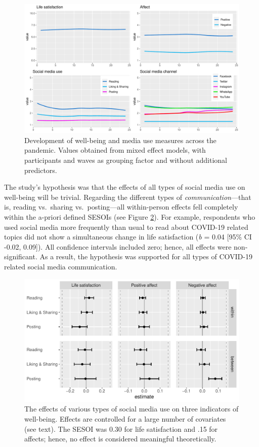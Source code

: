 \documentclass[
  english,
  man,mask,floatsintext]{apa6}
\begin{document}
\begin{figure}
\includegraphics[width=\textwidth]{figures/fig_descriptives} \caption{Development of well-being and media use measures across the pandemic. Values obtained from mixed effect models, with participants and waves as grouping factor and without additional predictors.}\label{fig:fig-desc}
\end{figure}

The study's hypothesis was that the effects of all types of social media use on well-being will be trivial.
Regarding the different types of \emph{communication}---that is, reading vs.~sharing vs.~posting---all within-person effects fell completely within the a-priori defined SESOIs (see Figure \ref{fig:res-activity}).
For example, respondents who used social media more frequently than usual to read about COVID-19 related topics did not show a simultaneous change in life satisfaction (\emph{b} = 0.04 {[}95\% CI -0.02, 0.09{]}).
All confidence intervals included zero; hence, all effects were non-significant.
As a result, the hypothesis was supported for all types of COVID-19 related social media communication.

\begin{figure}
\includegraphics[width=\textwidth]{figures/fig_results_activity} \caption{The effects of various types of social media use on three indicators of well-being. Effects are controlled for a large number of covariates (see text). The SESOI was 0.30 for life satisfaction and .15 for affects; hence, no effect is considered meaningful theoretically.}\label{fig:res-activity}
\end{figure}
\end{document}
